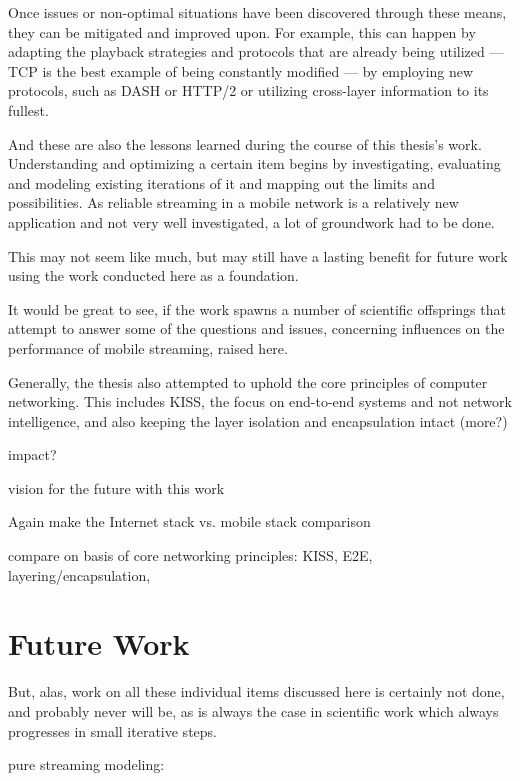 Once issues or non-optimal situations have been discovered through these means, they can be mitigated and improved upon. For example, this can happen by adapting the playback strategies and protocols that are already being utilized --- \gls{TCP} is the best example of being constantly modified --- by employing new protocols, such as \gls{DASH} or \gls{HTTP}/2 or utilizing cross-layer information to its fullest.

And these are also the lessons learned during the course of this thesis's work. Understanding and optimizing a certain item begins by investigating, evaluating and modeling existing iterations of it and mapping out the limits and possibilities. As reliable streaming in a mobile network is a relatively new application and not very well investigated, a lot of groundwork had to be done. 


This may not seem like much, but may still have a lasting benefit for future work using the work conducted here as a foundation.

It would be great to see, if the work spawns a number of scientific offsprings that attempt to answer some of the questions and issues, concerning influences on the performance of mobile streaming, raised here. 


Generally, the thesis also attempted to uphold the core principles of computer networking. This includes \gls{KISS}, the focus on end-to-end systems and not network intelligence, and also keeping the layer isolation and encapsulation intact (more?)

impact?

vision for the future with this work

Again make the Internet stack vs. mobile stack comparison


compare on basis of core networking principles: KISS, E2E, layering/encapsulation, 





\section{Future Work}

But, alas, work on all these individual items discussed here is certainly not done, and probably never will be, as is always the case in scientific work which always progresses in small iterative steps.

pure streaming modeling:

